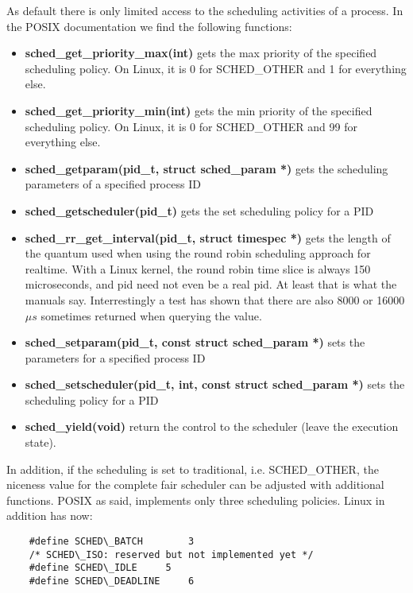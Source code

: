 \documentclass[]{scrartcl}
\begin{document}
As default there is only limited access to the scheduling activities of a process.
In the POSIX documentation we find the following functions:

\begin{itemize}
	\item \textbf{sched\_get\_priority\_max(int)}
		gets the max priority of the specified scheduling policy. On Linux, it is 0 for SCHED\_OTHER and 1 for everything else. 
	
	\item \textbf{sched\_get\_priority\_min(int)}
		gets the min priority of the specified scheduling policy. On Linux, it is 0 for SCHED\_OTHER and 99 for everything else. 
		
	\item \textbf{sched\_getparam(pid\_t, struct sched\_param *)}
		gets the scheduling parameters of a specified process ID
	
	\item \textbf{sched\_getscheduler(pid\_t)}
		gets the set scheduling policy for a PID
	
	\item \textbf{sched\_rr\_get\_interval(pid\_t, struct timespec *)}
		gets the length of the quantum used when using the round robin scheduling approach for realtime.
		With a Linux kernel, the round robin time slice is always 150 microseconds, and pid need not even be a real pid. At least that is what the manuals say. Interrestingly a test has shown that there are also 8000 or 16000 $\mu s$ sometimes returned when querying the value.
	
	\item \textbf{sched\_setparam(pid\_t, const struct sched\_param *)}
		sets the parameters for a specified process ID
	
	\item \textbf{sched\_setscheduler(pid\_t, int, const struct sched\_param *)}
		sets the scheduling policy for a PID
	
	\item \textbf{sched\_yield(void)}
		return the control to the scheduler (leave the execution state).
\end{itemize}

In addition, if the scheduling is set to traditional, i.e. SCHED\_OTHER, the niceness value for the complete fair scheduler can be adjusted with additional functions. 
POSIX as said, implements only three scheduling policies.
Linux in addition has now:

\begin{verbatim}
    #define SCHED\_BATCH		3
    /* SCHED\_ISO: reserved but not implemented yet */
    #define SCHED\_IDLE		5
    #define SCHED\_DEADLINE		6
\end{verbatim}
\end{document}
